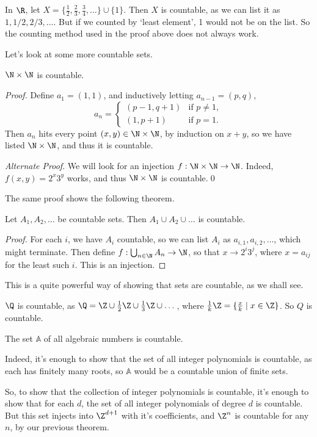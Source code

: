 \begin{remark}[A Warning]
	In $\R$, let $X = \{\frac{1}{2}, \frac{2}{3}, \frac{3}{4}, \dots \} \cup \{1\}$. Then $X$ is countable, as we can list it as $1, 1/2, 2/3, \dots$. But if we counted by `least element', 1 would not be on the list. So the counting method used in the proof above does not always work.
\end{remark}

Let's look at some more countable sets.

\begin{theorem}
	$\N \times \N$ is countable.
\end{theorem}
\begin{proof}
	Define $a_1 = (1, 1)$, and inductively letting $a_{n - 1} = (p, q)$, 
	$$
a_n = \begin{cases}
	(p - 1, q + 1) &\mbox{if } p \neq 1, \\
	(1, p + 1) &\mbox{if } p = 1.
   \end{cases}
	$$
	Then $a_n$ hits every point $(x, y) \in \N \times \N$, by induction on $x + y$, so we have listed $\N \times \N$, and thus it is countable. \qedhere
	
	\emph{Alternate Proof}. We will look for an injection $f : \N \times \N \rightarrow \N$. Indeed, $f(x, y) = 2^x 3^y$ works, and thus $\N \times \N$ is countable.\hfill \qed
\end{proof}

The same proof shows the following theorem.

\begin{theorem}
	Let $A_1, A_2, \dots$ be countable sets. Then $A_1 \cup A_2 \cup \dots$ is countable.
\end{theorem}
\begin{proof}
	For each $i$, we have $A_i$ countable, so we can list $A_i$ as $a_{i, 1}, a_{i, 2}, \dots$, which might terminate.
	Then define $f : \bigcup_{n \in \N} A_n \rightarrow \N$, so that $x \rightarrow 2^i 3^j$, where $x = a_{ij}$ for the least such $i$.
This is an injection.
\end{proof}

This is a quite powerful way of showing that sets are countable, as we shall see.

\begin{example}
	$\Q$ is countable, as $\Q = \Z \cup \frac{1}{2}\Z \cup \frac{1}{3}\Z \cup \dots$, where $\frac{1}{k}\Z = \{\frac{x}{k} \mid x \in \Z\}$. So $Q$ is countable.
\end{example}
\begin{example}
	The set $\mathbb{A}$ of all algebraic numbers is countable. 
	
	Indeed, it's enough to show that the set of all integer polynomials is countable, as each has finitely many roots, so $\mathbb{A}$ would be a countable union of finite sets.

	So, to show that the collection of integer polynomials is countable, it's enough to show that for each $d$, the set of all integer polynomials of degree $d$ is countable. But this set injects into $\Z^{d + 1}$ with it's coefficients, and $\Z^n$ is countable for any $n$, by our previous theorem.
\end{example}

